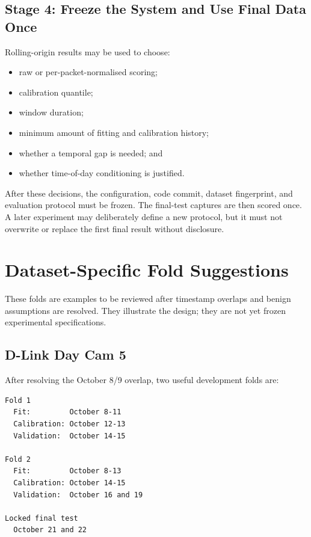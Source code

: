 \documentclass[11pt,a4paper]{article}
\begin{document}
\subsection{Stage 4: Freeze the System and Use Final Data Once}

Rolling-origin results may be used to choose:

\begin{itemize}

\item raw or per-packet-normalised scoring;

\item calibration quantile;

\item window duration;

\item minimum amount of fitting and calibration history;

\item whether a temporal gap is needed; and

\item whether time-of-day conditioning is justified.

\end{itemize}

After these decisions, the configuration, code commit, dataset fingerprint,
and evaluation protocol must be frozen. The final-test captures are then scored
once. A later experiment may deliberately define a new protocol, but it must
not overwrite or replace the first final result without disclosure.

\section{Dataset-Specific Fold Suggestions}

These folds are examples to be reviewed after timestamp overlaps and benign
assumptions are resolved. They illustrate the design; they are not yet frozen
experimental specifications.

\subsection{D-Link Day Cam 5}

After resolving the October 8/9 overlap, two useful development folds are:

\begin{verbatim}
Fold 1
  Fit:         October 8-11
  Calibration: October 12-13
  Validation:  October 14-15

Fold 2
  Fit:         October 8-13
  Calibration: October 14-15
  Validation:  October 16 and 19

Locked final test
  October 21 and 22
\end{verbatim}
\end{document}
